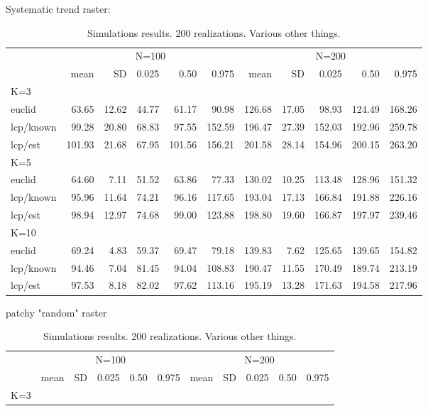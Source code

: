 \documentclass[12pt]{article}
\begin{document}
\begin{table}[h]
{\small
\caption{Simulations results. 200 realizations. Various other things.}
Systematic trend raster: \\
\begin{tabular}{l|rrrrrrrrrr}
         & \multicolumn{5}{c}{N=100   } & \multicolumn{5}{c}{N=200  }  \\
         &   mean &  SD  & 0.025 & 0.50 & 0.975  & mean  & SD   & 0.025 & 0.50  & 0.975 \\ \hline
K=3      &        &      &       &      &        &       &      &       &       &       \\
euclid   &   63.65& 12.62& 44.77 & 61.17&  90.98 & 126.68& 17.05&  98.93& 124.49& 168.26 \\
lcp/known&   99.28& 20.80& 68.83 & 97.55& 152.59 & 196.47& 27.39& 152.03& 192.96& 259.78\\
lcp/est  &  101.93& 21.68& 67.95 &101.56& 156.21 & 201.58& 28.14& 154.96& 200.15& 263.20\\
K=5      &        &      &       &      &        &       &      &       &       &        \\
euclid   &  64.60 & 7.11 & 51.52 & 63.86&  77.33 & 130.02& 10.25& 113.48& 128.96& 151.32\\
lcp/known&  95.96 &11.64 & 74.21 & 96.16& 117.65 & 193.04& 17.13& 166.84& 191.88& 226.16\\
lcp/est  &  98.94 &12.97 & 74.68 & 99.00& 123.88 & 198.80& 19.60& 166.87& 197.97& 239.46\\
K=10     &        &      &       &      &        &       &      &       &       &       \\
euclid   &  69.24 & 4.83 & 59.37 & 69.47&  79.18 & 139.83&  7.62& 125.65& 139.65& 154.82\\
lcp/known&  94.46 & 7.04 & 81.45 & 94.04& 108.83 & 190.47& 11.55& 170.49& 189.74& 213.19\\
lcp/est  &  97.53 & 8.18 & 82.02 & 97.62& 113.16 & 195.19& 13.28& 171.63& 194.58& 217.96\\
\end{tabular}
patchy "random" raster \\
\begin{tabular}{lrrrrrrrrrr}
         & \multicolumn{5}{c}{N=100  } & \multicolumn{5}{c}{N=200   }  \\
         &   mean &  SD  & 0.025 & 0.50  & 0.975  & mean  & SD   & 0.025 & 0.50  & 0.975 \\ \hline
K=3      &        &      &       &       &        &       &      &       &       &       \\

\end{tabular}}
\end{table}
\end{document}
